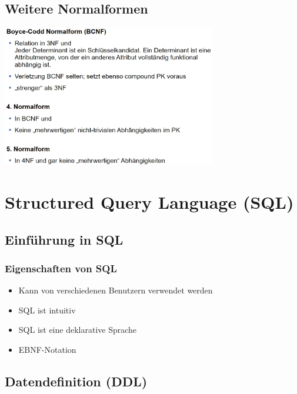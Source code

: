 \documentclass{scrreprt}
\begin{document}
\section{Weitere Normalformen}
\includegraphics[width=0.7\textwidth]{"graphics/weiterNF"}
\chapter{Structured Query Language (SQL)}
\section{Einführung in SQL}
\subsection{Eigenschaften von SQL}
\begin{itemize}
  \item Kann von verschiedenen Benutzern verwendet werden
  \item SQL ist intuitiv
  \item SQL ist eine deklarative Sprache
  \item EBNF-Notation
\end{itemize}
\section{Datendefinition (DDL)}
\end{document}
